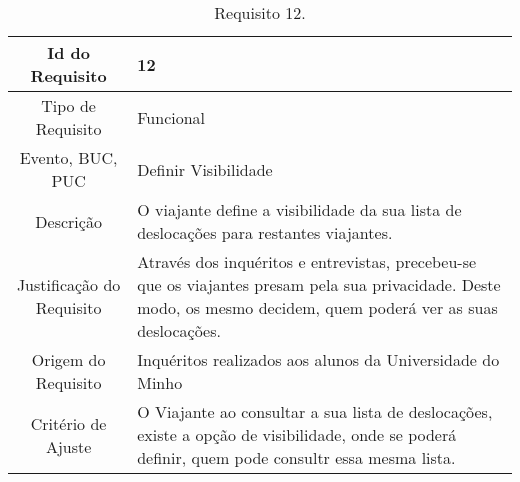 \begin{table}[H]
\begin{center}
  \begin{tabularx}{\textwidth}{ | c | X | }
    \hline
    Id do Requisito & 12  \\
    
    \hline
    Tipo de Requisito & Funcional \\
    
    \hline
    Evento, BUC, PUC &  Definir Visibilidade\\
    
    \hline
    Descrição & O viajante define a visibilidade da sua lista de deslocações para restantes viajantes. \\
    
    \hline
    Justificação do Requisito & Através dos inquéritos e entrevistas, precebeu-se que os viajantes presam pela sua privacidade. Deste modo, os mesmo decidem, quem poderá ver as suas deslocações.  \\
    
    \hline
    Origem do Requisito & Inquéritos realizados aos alunos da Universidade do Minho \\
    
    \hline
    Critério de Ajuste & O Viajante ao consultar a sua lista de deslocações, existe a opção de visibilidade, onde se poderá definir, quem pode consultr essa mesma lista.  \\
    
    \hline
  \end{tabularx}
  \caption{Requisito 12.} \label{tab:r3}
\end{center}
\end{table}

